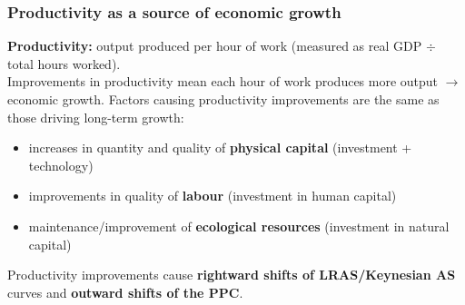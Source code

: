 \subsubsection*{Productivity as a source of economic growth}
\textbf{Productivity:} output produced per hour of work (measured as real GDP $\div$ total hours worked). \\Improvements in productivity mean each hour of work produces more output $\to$ economic growth. Factors causing productivity improvements are the same as those driving long-term growth:
\begin{itemize}
  \item increases in quantity and quality of \textbf{physical capital} (investment + technology)
  \item improvements in quality of \textbf{labour} (investment in human capital)
  \item maintenance/improvement of \textbf{ecological resources} (investment in natural capital)
\end{itemize}
Productivity improvements cause \textbf{rightward shifts of LRAS/Keynesian AS} curves and \textbf{outward shifts of the PPC}.
